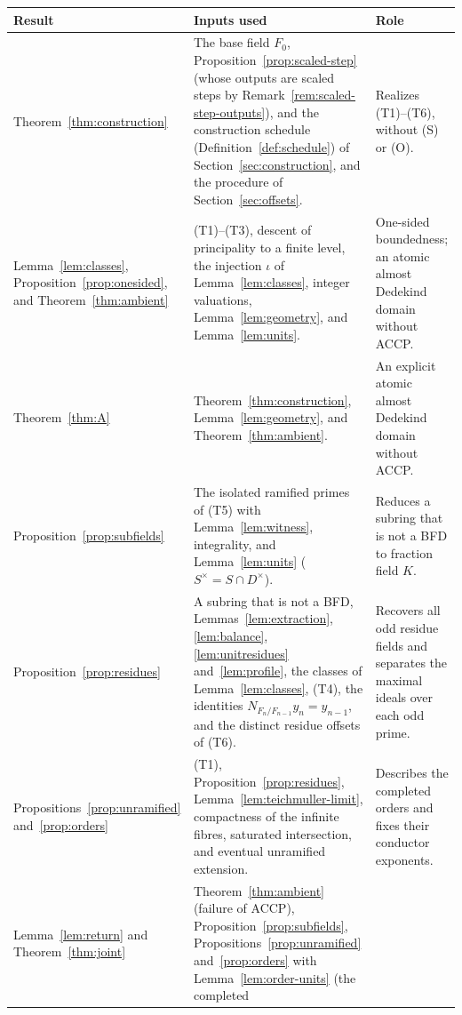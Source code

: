 \documentclass[11pt]{article}
\theoremstyle{plain}
\theoremstyle{definition}
\theoremstyle{remark}
\begin{document}
\begin{longtable}{@{}>{\raggedright\arraybackslash}p{}>{\raggedright\arraybackslash}p{}>{\raggedright\arraybackslash}p{}@{}}
\toprule
Result & Inputs used & Role\\
\midrule
\endhead
Theorem~\ref{thm:construction} &
The base field $F_0$, Proposition~\ref{prop:scaled-step} (whose
outputs are scaled steps by Remark~\ref{rem:scaled-step-outputs}), and
the construction schedule (Definition~\ref{def:schedule}) of
Section~\ref{sec:construction}, and the procedure of
Section~\ref{sec:offsets}. &
Realizes \textup{(T1)--(T6)}, without (S) or (O).\\[4pt]
Lemma~\ref{lem:classes}, Proposition~\ref{prop:onesided}, and
Theorem~\ref{thm:ambient} &
\textup{(T1)--(T3)}, descent of principality to a finite level, the
injection $\iota$ of Lemma~\ref{lem:classes}, integer valuations,
Lemma~\ref{lem:geometry}, and Lemma~\ref{lem:units}. &
One-sided boundedness; an atomic almost Dedekind domain without ACCP.\\[4pt]
Theorem~\ref{thm:A} &
Theorem~\ref{thm:construction}, Lemma~\ref{lem:geometry}, and
Theorem~\ref{thm:ambient}. &
An explicit atomic almost Dedekind domain without ACCP.\\[4pt]
Proposition~\ref{prop:subfields} &
The isolated ramified primes of \textup{(T5)} with Lemma~\ref{lem:witness},
integrality, and Lemma~\ref{lem:units} ($S^\times=S\cap D^\times$). &
Reduces a subring that is not a BFD to fraction field $K$.\\[4pt]
Proposition~\ref{prop:residues} &
A subring that is not a BFD, Lemmas~\ref{lem:extraction},
\ref{lem:balance}, \ref{lem:unitresidues} and~\ref{lem:profile}, the classes
of Lemma~\ref{lem:classes}, \textup{(T4)}, the identities $N_{F_n/F_{n-1}}y_n=y_{n-1}$, and the
distinct residue offsets of \textup{(T6)}. &
Recovers all odd residue fields and separates the maximal ideals over
each odd prime.\\[4pt]
Propositions~\ref{prop:unramified} and~\ref{prop:orders} &
\textup{(T1)}, Proposition~\ref{prop:residues},
Lemma~\ref{lem:teichmuller-limit}, compactness of the
infinite fibres, saturated intersection, and eventual unramified
extension. &
Describes the completed orders and fixes their conductor exponents.\\[4pt]
Lemma~\ref{lem:return} and Theorem~\ref{thm:joint} &
Theorem~\ref{thm:ambient} (failure of ACCP),
Proposition~\ref{prop:subfields}, Propositions~\ref{prop:unramified}
and~\ref{prop:orders} with Lemma~\ref{lem:order-units} (the completed

\end{longtable}
\end{document}
